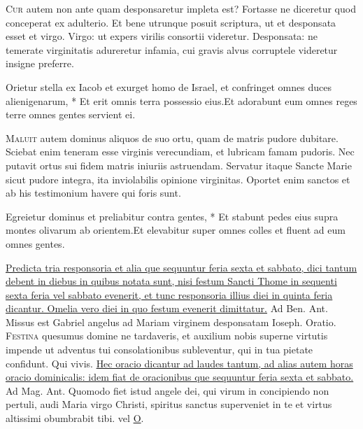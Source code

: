 \begin{multicols*}{2}
\begin{responsory}
\end{responsory}
\lettrine[lines=2]{\zallmancaps \color{Blue} C}{ur} autem non ante quam desponsaretur impleta est? Fortasse ne diceretur quod conceperat ex adulterio. Et bene utrunque posuit scriptura, ut et desponsata esset et virgo. Virgo: ut expers virilis consortii videretur. Desponsata: ne temerate virginitatis adureretur infamia, cui gravis alvus corruptele videretur insigne preferre.
\begin{responsory}
{Orietur stella ex Iacob et exurget homo de Israel, et confringet omnes duces alienigenarum, * Et erit omnis terra possessio eius.}{Et adorabunt eum omnes reges terre omnes gentes servient ei.}
\end{responsory}
\lettrine[lines=2]{\zallmancaps \color{Red} M}{aluit} autem dominus aliquos de suo ortu, quam de matris pudore dubitare. Sciebat enim teneram esse virginis verecundiam, et lubricam famam pudoris. Nec putavit ortus sui fidem matris iniuriis astruendam. Servatur itaque Sancte Marie sicut pudore integra, ita inviolabilis opinione virginitas. Oportet enim sanctos et ab his testimonium havere qui foris sunt.
\begin{responsory-doxology}
{Egreietur dominus et preliabitur contra gentes, * Et stabunt pedes eius supra montes olivarum ab orientem.}{Et elevabitur super omnes colles et fluent ad eum omnes gentes.}
\end{responsory-doxology}
\newline \ul{Predicta tria responsoria et alia que sequuntur feria sexta et sabbato, dici tantum debent in diebus in quibus notata sunt, nisi festum Sancti Thome in sequenti sexta feria vel sabbato evenerit, et tunc responsoria illius diei in quinta feria dicantur. Omelia vero diei in quo festum evenerit dimittatur.} {\color{Red} Ad Ben. Ant.} Missus est Gabriel angelus ad Mariam virginem desponsatam Ioseph. {\color{Red} Oratio.}
\lettrine[lines=2]{\zallmancaps \color{Blue} F}{estina} quesumus domine ne tardaveris, et auxilium nobis superne virtutis impende ut adventus tui consolationibus subleventur, qui in tua pietate confidunt. Qui vivis.
\newline \ul{Hec oracio dicantur ad laudes tantum, ad alias autem horas oracio dominicalis: idem fiat de oracionibus que sequuntur feria sexta et sabbato.} {\color{Red} Ad Mag. Ant.} Quomodo fiet istud angele dei, qui virum in concipiendo non pertuli, audi Maria virgo Christi, spiritus sanctus superveniet in te et virtus altissimi obumbrabit tibi. {\color{Red} vel} \hyperlink{o-antiphons}{O}.

\end{multicols*}
